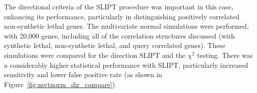 \iffalse
\begin{figure*}[!htbp]
  \begin{center}
  \resizebox{0.5 \textwidth}{!}{
  \fbox{
    \texttt{[image: \{"/home/tomkelly/Documents/PhD Otago Uni/SL\_Model/RUN\_20150507y/SL\_Model\_Test\_Graph\_10K\_Graph1\_ROC\_Compare\_Mvtn(Apry)\_v\_Cor(Mayxy)\_Full"]}}
   }
   }
   \end{center}
   \caption[Comparison of performance for query correlations]{\small \textbf{Comparison of performance for query correlations.} Multivariate simulation of \glspl{synthetic lethal} with correlation structure (in colour) clearly has lower performance than simulation including query correlations (in greyscale) across parameters. The query correlation simulation shows predictive potential for \gls{SLIPT} even with many underlying \gls{synthetic lethal} partners as positively correlated genes are distinguished robustly.}
\label{fig:mvtnorm_query_cor_compare}
\end{figure*}
\fi


The directional criteria of the \gls{SLIPT} procedure was important in this case, enhancing its performance, particularly in distinguishing positively correlated non-synthetic lethal genes. The multivariate normal simulations were performed, with 20,000 genes, including all of the correlation structures discussed (with synthetic lethal, non-synthetic lethal, and query correlated genes). These simulations were compared for the direction \gls{SLIPT} and  the $\chi^2$ testing. There was a considerably higher statistical performance with \gls{SLIPT}, particularly increased sensitivity and lower false positive rate (as shown in Figure~\ref{fig:mvtnorm_dir_compare}).


